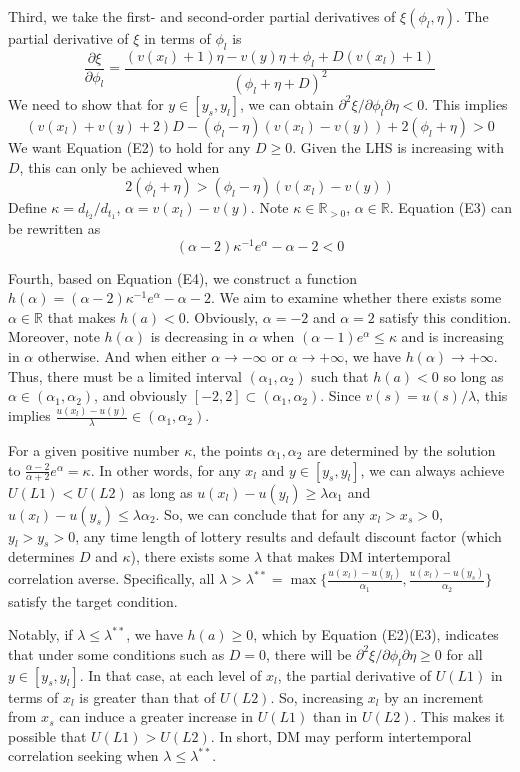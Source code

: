 \documentclass[
  12pt,
]{article}
\begin{document}
Third, we take the first- and second-order partial derivatives of
\(\xi(\phi_l,\eta)\). The partial derivative of \(\xi\) in terms of
\(\phi_l\) is\[
\frac{\partial \xi}{\partial \phi_l}=\frac{(v(x_l)+1)\eta-v(y)\eta+\phi_l+D(v(x_l)+1)}{(\phi_l+\eta+D)^2}
\]We need to show that for \(y\in[y_s,y_l]\), we can obtain
\(\partial^2 \xi/\partial \phi_l\partial \eta<0\). This
implies\[\tag{E2}
(v(x_l)+v(y)+2)D-(\phi_l-\eta)(v(x_l)-v(y))+2(\phi_l+\eta)>0
\]We want Equation (E2) to hold for any \(D\geq 0\). Given the LHS is
increasing with \(D\), this can only be achieved when\[\tag{E3}
2(\phi_l+\eta)>(\phi_l-\eta)(v(x_l)-v(y))
\]Define \(\kappa=d_{t_2}/d_{t_1}\), \(\alpha=v(x_l)-v(y)\). Note
\(\kappa\in \mathbb{R}_{>0}\), \(\alpha\in\mathbb{R}\). Equation (E3)
can be rewritten as\[\tag{E4}
(\alpha-2)\kappa^{-1} e^{\alpha}-\alpha-2<0
\]

Fourth, based on Equation (E4), we construct a function
\(h(\alpha)=(\alpha-2)\kappa^{-1} e^\alpha-\alpha-2\). We aim to examine
whether there exists some \(\alpha\in\mathbb{R}\) that makes \(h(a)<0\).
Obviously, \(\alpha=-2\) and \(\alpha=2\) satisfy this condition.
Moreover, note \(h(\alpha)\) is decreasing in \(\alpha\) when
\((\alpha-1)e^{\alpha}\leq \kappa\) and is increasing in \(\alpha\)
otherwise. And when either \(\alpha\rightarrow -\infty\) or
\(\alpha \rightarrow +\infty\), we have
\(h(\alpha)\rightarrow +\infty\). Thus, there must be a limited interval
\((\alpha_1,\alpha_2)\) such that \(h(a)<0\) so long as
\(\alpha\in(\alpha_1,\alpha_2)\), and obviously
\([-2,2]\subset(\alpha_1,\alpha_2)\). Since \(v(s)=u(s)/\lambda\), this
implies \(\frac{u(x_l)-u(y)}{\lambda}\in(\alpha_1,\alpha_2)\).

For a given positive number \(\kappa\), the points \(\alpha_1,\alpha_2\)
are determined by the solution to
\(\frac{\alpha-2}{\alpha+2}e^{\alpha}=\kappa\). In other words, for any
\(x_l\) and \(y\in[y_s,y_l]\), we can always achieve \(U(L1)<U(L2)\) as
long as \(u(x_l)-u(y_l)\geq \lambda\alpha_1\) and
\(u(x_l)-u(y_s)\leq\lambda\alpha_2\). So, we can conclude that for any
\(x_l>x_s>0\), \(y_l>y_s>0\), any time length of lottery results and
default discount factor (which determines \(D\) and \(\kappa\)), there
exists some \(\lambda\) that makes DM intertemporal correlation averse.
Specifically, all
\(\lambda>\lambda^{**} ={\max}\{\frac{u(x_l)-u(y_l)}{\alpha_1},\frac{u(x_l)-u(y_s)}{\alpha_2}\}\)
satisfy the target condition.

Notably, if \(\lambda\leq\lambda^{**}\), we have \(h(a)\geq0\), which by
Equation (E2)(E3), indicates that under some conditions such as \(D=0\),
there will be \(\partial^2 \xi/\partial \phi_l\partial \eta\geq0\) for
all \(y\in[y_s,y_l]\). In that case, at each level of \(x_l\), the
partial derivative of \(U(L1)\) in terms of \(x_l\) is greater than that
of \(U(L2)\). So, increasing \(x_l\) by an increment from \(x_s\) can
induce a greater increase in \(U(L1)\) than in \(U(L2)\). This makes it
possible that \(U(L1)>U(L2)\). In short, DM may perform intertemporal
correlation seeking when \(\lambda\leq\lambda^{**}\).
\end{document}

